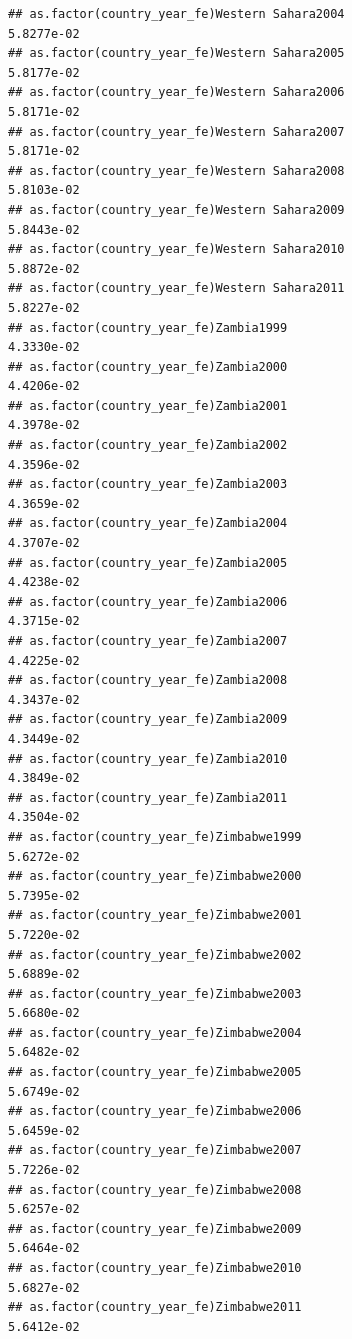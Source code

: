 \documentclass[
  a4paper,
]{article}
\begin{document}
\begin{verbatim}
## as.factor(country_year_fe)Western Sahara2004                    5.8277e-02
## as.factor(country_year_fe)Western Sahara2005                    5.8177e-02
## as.factor(country_year_fe)Western Sahara2006                    5.8171e-02
## as.factor(country_year_fe)Western Sahara2007                    5.8171e-02
## as.factor(country_year_fe)Western Sahara2008                    5.8103e-02
## as.factor(country_year_fe)Western Sahara2009                    5.8443e-02
## as.factor(country_year_fe)Western Sahara2010                    5.8872e-02
## as.factor(country_year_fe)Western Sahara2011                    5.8227e-02
## as.factor(country_year_fe)Zambia1999                            4.3330e-02
## as.factor(country_year_fe)Zambia2000                            4.4206e-02
## as.factor(country_year_fe)Zambia2001                            4.3978e-02
## as.factor(country_year_fe)Zambia2002                            4.3596e-02
## as.factor(country_year_fe)Zambia2003                            4.3659e-02
## as.factor(country_year_fe)Zambia2004                            4.3707e-02
## as.factor(country_year_fe)Zambia2005                            4.4238e-02
## as.factor(country_year_fe)Zambia2006                            4.3715e-02
## as.factor(country_year_fe)Zambia2007                            4.4225e-02
## as.factor(country_year_fe)Zambia2008                            4.3437e-02
## as.factor(country_year_fe)Zambia2009                            4.3449e-02
## as.factor(country_year_fe)Zambia2010                            4.3849e-02
## as.factor(country_year_fe)Zambia2011                            4.3504e-02
## as.factor(country_year_fe)Zimbabwe1999                          5.6272e-02
## as.factor(country_year_fe)Zimbabwe2000                          5.7395e-02
## as.factor(country_year_fe)Zimbabwe2001                          5.7220e-02
## as.factor(country_year_fe)Zimbabwe2002                          5.6889e-02
## as.factor(country_year_fe)Zimbabwe2003                          5.6680e-02
## as.factor(country_year_fe)Zimbabwe2004                          5.6482e-02
## as.factor(country_year_fe)Zimbabwe2005                          5.6749e-02
## as.factor(country_year_fe)Zimbabwe2006                          5.6459e-02
## as.factor(country_year_fe)Zimbabwe2007                          5.7226e-02
## as.factor(country_year_fe)Zimbabwe2008                          5.6257e-02
## as.factor(country_year_fe)Zimbabwe2009                          5.6464e-02
## as.factor(country_year_fe)Zimbabwe2010                          5.6827e-02
## as.factor(country_year_fe)Zimbabwe2011                          5.6412e-02

\end{verbatim}
\end{document}
